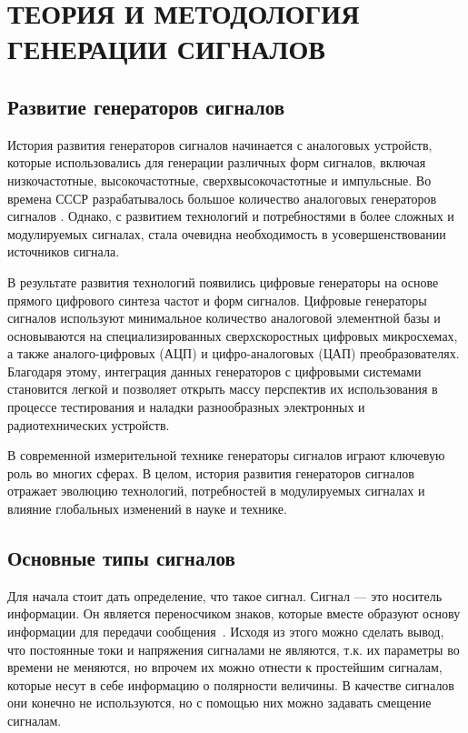\chapter{ТЕОРИЯ И МЕТОДОЛОГИЯ ГЕНЕРАЦИИ СИГНАЛОВ}

\section{Развитие генераторов сигналов}
	История развития генераторов сигналов начинается с аналоговых устройств, которые
использовались для генерации различных форм сигналов, включая низкочастотные,
высокочастотные, сверхвысокочастотные и импульсные. Во времена СССР разрабатывалось большое количество аналоговых генераторов сигналов \cite{dgs}. Однако, с развитием технологий и потребностями в более сложных и модулируемых сигналах, стала очевидна необходимость в усовершенствовании источников сигнала.

	В результате развития технологий появились цифровые генераторы на основе прямого цифрового синтеза частот и форм сигналов. Цифровые генераторы сигналов используют минимальное количество аналоговой элементной базы и основываются на специализированных сверхскоростных цифровых микросхемах, а также аналого-цифровых (АЦП) и цифро-аналоговых (ЦАП) преобразователях. Благодаря этому, интеграция данных генераторов с цифровыми системами становится легкой и позволяет открыть массу перспектив их использования в процессе тестирования и наладки разнообразных электронных и радиотехнических устройств. 

	В современной измерительной технике генераторы сигналов играют ключевую роль во многих сферах. %
	В целом, история развития генераторов сигналов отражает эволюцию технологий, потребностей в модулируемых сигналах и влияние глобальных изменений в науке и технике.

\section{Основные типы сигналов}
	Для начала стоит дать определение, что такое сигнал. Сигнал --- это носитель информации. Он является переносчиком знаков, которые вместе образуют основу информации для передачи сообщения~\cite{dgs}. Исходя из этого можно сделать вывод, что постоянные токи и напряжения сигналами не являются, т.к. их параметры во времени не меняются, но впрочем их можно отнести к простейшим сигналам, которые несут в себе информацию о полярности величины. В качестве сигналов они конечно не используются, но с помощью них можно задавать смещение сигналам.

